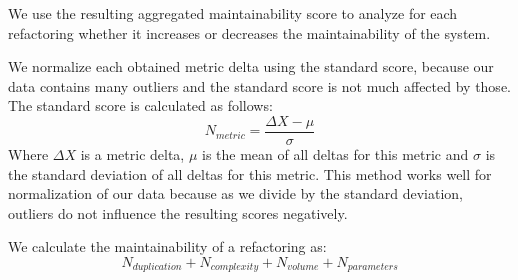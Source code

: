 \documentclass[a4paper,UKenglish,cleveref, autoref, thm-restate,authorcolumns]{lipics-v2019}
\begin{document}
We use the resulting aggregated maintainability score to analyze  for each refactoring whether it increases or decreases the maintainability of the system.

We normalize each obtained metric delta using the standard score, because our data contains many outliers and the standard score is not much affected by those. The standard score is calculated as follows:
\begin{equation}\label{eq:scoredev}
N_{metric} = \frac {\Delta X-\mu}{\sigma}
\end{equation}
Where $\Delta X$ is a metric delta, $\mu$ is the mean of all deltas for this metric and $\sigma$ is the standard deviation of all deltas for this metric. This method works well for normalization of our data because as we divide by the standard deviation, outliers do not influence the resulting scores negatively.%

We calculate the maintainability of a refactoring as:
\begin{equation}\label{eq:scoreref}
N_{duplication} + N_{complexity} + N_{volume} + N_{parameters}
\end{equation}


\end{document}
